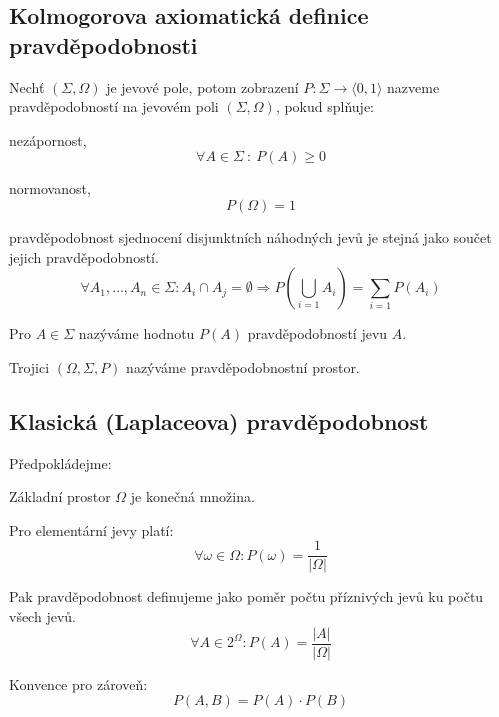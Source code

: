 \subsection{Kolmogorova axiomatická definice pravděpodobnosti}

\begin{compactitem}
    \item Nechť $(\Sigma, \Omega)$ je jevové pole, potom zobrazení $P : \Sigma \rightarrow \langle 0, 1 \rangle$ nazveme pravděpodobností na jevovém poli $(\Sigma, \Omega)$, pokud splňuje: \begin{compactitem}
        \item nezápornost,
        $$\forall A \in \Sigma ~:~ P(A) \geq 0$$
        \item normovanost,
        $$ P(\Omega) = 1 $$
        \item pravděpodobnost sjednocení disjunktních náhodných jevů je stejná jako součet jejich pravděpodobností.
        $$ \forall A_1, \ldots, A_n \in \Sigma : A_i \cap A_j = \emptyset \Rightarrow P \left( \bigcup_{i=1} A_i \right) = \sum_{i=1} P(A_i) $$
    \end{compactitem}

    \item Pro $A \in \Sigma$ nazýváme hodnotu $P(A)$ pravděpodobností jevu $A$.

    \item Trojici $ (\Omega, \Sigma, P) $ nazýváme pravděpodobnostní prostor.
\end{compactitem}

\subsection{Klasická (Laplaceova) pravděpodobnost}

\begin{compactitem}
    \item Předpokládejme: \begin{compactitem}
        \item Základní prostor $\Omega$ je konečná množina.
        \item Pro elementární jevy platí:
        $$\forall \omega \in \Omega : P(\omega) = \frac{1}{|\Omega|}$$
    \end{compactitem}

    \item Pak pravděpodobnost definujeme jako poměr počtu příznivých jevů ku počtu všech jevů.
    $$ \forall A \in 2^{\Omega} : P(A) = \frac{|A|}{|\Omega|} $$

    \item Konvence pro zároveň:
    $$ P(A, B) = P(A) \cdot P(B) $$
\end{compactitem}

